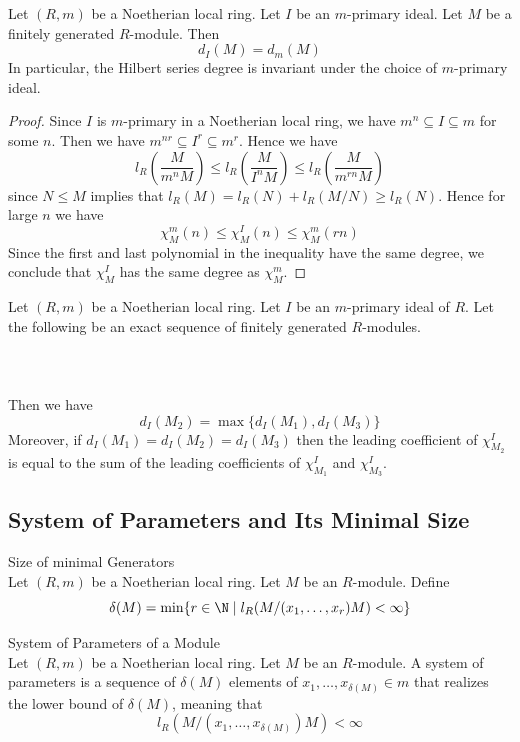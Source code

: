 \documentclass[a4paper]{article}
\begin{document}
\begin{prp}{}{} Let $(R,m)$ be a Noetherian local ring. Let $I$ be an $m$-primary ideal. Let $M$ be a finitely generated $R$-module. Then $$d_I(M)=d_m(M)$$ In particular, the Hilbert series degree is invariant under the choice of $m$-primary ideal. 
\begin{proof}
Since $I$ is $m$-primary in a Noetherian local ring, we have $m^n\subseteq I\subseteq m$ for some $n$. Then we have $m^{nr}\subseteq I^r\subseteq m^r$. Hence we have $$l_R\left(\frac{M}{m^nM}\right)\leq l_R\left(\frac{M}{I^nM}\right)\leq l_R\left(\frac{M}{m^{rn}M}\right)$$ since $N\leq M$ implies that $l_R(M)=l_R(N)+l_R(M/N)\geq l_R(N)$. Hence for large $n$ we have $$\chi_M^m(n)\leq\chi_M^I(n)\leq\chi_M^m(rn)$$ Since the first and last polynomial in the inequality have the same degree, we conclude that $\chi_M^I$ has the same degree as $\chi_M^m$. 
\end{proof}
\end{prp}

\begin{prp}{}{} Let $(R,m)$ be a Noetherian local ring. Let $I$ be an $m$-primary ideal of $R$. Let the following be an exact sequence of finitely generated $R$-modules. \\~\\
\\~\\
Then we have $$d_I(M_2)=\max\{d_I(M_1),d_I(M_3)\}$$ Moreover, if $d_I(M_1)=d_I(M_2)=d_I(M_3)$ then the leading coefficient of $\chi_{M_2}^I$ is equal to the sum of the leading coefficients of $\chi_{M_1}^I$ and $\chi_{M_3}^I$. 
\end{prp}

\subsection{System of Parameters and Its Minimal Size}
\begin{defn}{Size of minimal Generators}{}\\
Let $(R,m)$ be a Noetherian local ring. Let $M$ be an $R$-module. Define $$\delta(M)=\min\{r\in\N\;|\;l_R(M/(x_1,\dots,x_r)M)<\infty\}$$
\end{defn}

\begin{defn}{System of Parameters of a Module}{}\\
Let $(R,m)$ be a Noetherian local ring. Let $M$ be an $R$-module. A system of parameters is a sequence of $\delta(M)$ elements of $x_1,\dots,x_{\delta(M)}\in m$ that realizes the lower bound of $\delta(M)$, meaning that $$l_R(M/(x_1,\dots,x_{\delta(M)})M)<\infty$$
\end{defn}
\end{document}

